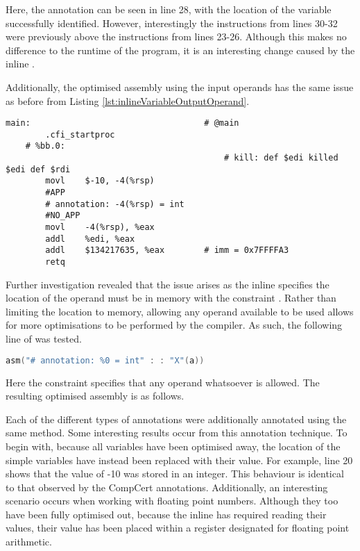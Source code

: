 Here, the annotation can be seen in line 28, with the location of the variable successfully identified. However, interestingly the instructions from lines 30-32 were previously above the instructions from lines 23-26. Although this makes no difference to the runtime of the program, it is an interesting change caused by the inline . 

Additionally, the optimised assembly using the input operands has the same issue as before from Listing \ref{lst:inlineVariableOutputOperand}.

\begin{lstlisting}[firstnumber=6, caption=variable-O3.s]
    main:                                   # @main
        .cfi_startproc
    # %bb.0:
                                            # kill: def $edi killed $edi def $rdi
        movl	$-10, -4(%rsp)
        #APP
        # annotation: -4(%rsp) = int
        #NO_APP
        movl	-4(%rsp), %eax
        addl	%edi, %eax
        addl	$134217635, %eax        # imm = 0x7FFFFA3
        retq
\end{lstlisting}

Further investigation revealed that the issue arises as the inline  specifies the location of the operand must be in memory with the constraint . Rather than limiting the location to memory, allowing any operand available to be used allows for more optimisations to be performed by the compiler. As such, the following line of  was tested. 

\begin{lstlisting}[language=C, numbers=none]
asm("# annotation: %0 = int" : : "X"(a))
\end{lstlisting}

Here the constraint  specifies that any operand whatsoever is allowed. The resulting optimised assembly is as follows.



Each of the different types of annotations were additionally annotated using the same method. Some interesting results occur from this annotation technique. To begin with, because all variables have been optimised away, the location of the simple variables have instead been replaced with their value. For example, line 20 shows that the value of -10 was stored in an integer. This behaviour is identical to that observed by the CompCert annotations. Additionally, an interesting scenario occurs when working with floating point numbers. Although they too have been fully optimised out, because the inline  has required reading their values, their value has been placed within a register designated for floating point arithmetic. 


